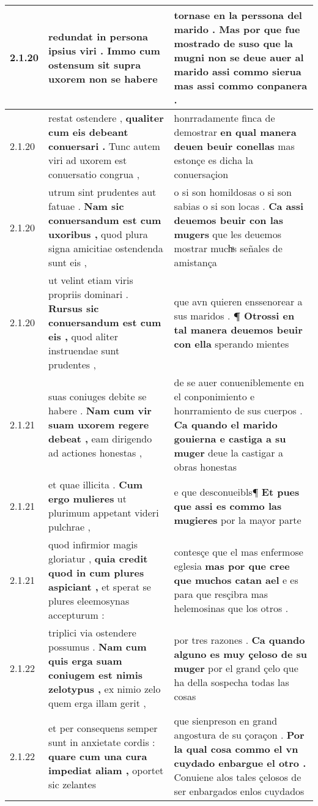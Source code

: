 \begin{tabular}{|p{1cm}|p{6.5cm}|p{6.5cm}|}
2.1.20 & redundat in persona ipsius viri . \textbf{ Immo cum ostensum sit supra uxorem } non se habere & tornase en la perssona del marido . \textbf{ Mas por que fue mostrado de suso que la mugni non se deue auer al marido } assi commo sierua mas assi commo conpanera . \\\hline
2.1.20 & restat ostendere , \textbf{ qualiter cum eis debeant conuersari . } Tunc autem viri ad uxorem est conuersatio congrua , & honrradamente finca de demostrar \textbf{ en qual manera deuen beuir conellas } mas estonçe es dicha la conuersaçion \\\hline
2.1.20 & utrum sint prudentes aut fatuae . \textbf{ Nam sic conuersandum est cum uxoribus , } quod plura signa amicitiae ostendenda sunt eis , & o si son homildosas o si son sabias o si son locas . \textbf{ Ca assi deuemos beuir con las mugers } que les deuemos mostrar muchͣs señales de amistança \\\hline
2.1.20 & ut velint etiam viris propriis dominari . \textbf{ Rursus sic conuersandum est cum eis , } quod aliter instruendae sunt prudentes , & que avn quieren enssenorear a sus maridos . \textbf{ ¶ Otrossi en tal manera deuemos beuir con ella } sperando mientes \\\hline
2.1.21 & suas coniuges debite se habere . \textbf{ Nam cum vir suam uxorem regere debeat , } eam dirigendo ad actiones honestas , & de se auer conueniblemente en el conponimiento e honrramiento de sus cuerpos . \textbf{ Ca quando el marido gouierna e castiga a su muger } deue la castigar a obras honestas \\\hline
2.1.21 & et quae illicita . \textbf{ Cum ergo mulieres } ut plurimum appetant videri pulchrae , & e que desconueibls¶ \textbf{ Et pues que assi es commo las mugieres } por la mayor parte \\\hline
2.1.21 & quod infirmior magis gloriatur , \textbf{ quia credit quod in cum plures aspiciant , } et sperat se plures eleemosynas accepturum : & contesçe que el mas enfermose eglesia \textbf{ mas por que cree que muchos catan ael } e es para que resçibra mas helemosinas que los otros . \\\hline
2.1.22 & triplici via ostendere possumus . \textbf{ Nam cum quis erga suam coniugem est nimis zelotypus , } ex nimio zelo quem erga illam gerit , & por tres razones . \textbf{ Ca quando alguno es muy çeloso de su muger } por el grand çelo que ha della sospecha todas las cosas \\\hline
2.1.22 & et per consequens semper sunt in anxietate cordis : \textbf{ quare cum una cura impediat aliam , } oportet sic zelantes & que sienpreson en grand angostura de su çoraçon . \textbf{ Por la qual cosa commo el vn cuydado enbargue el otro . } Conuiene alos tales çelosos de ser enbargados enlos cuydados \\\hline

\end{tabular}
